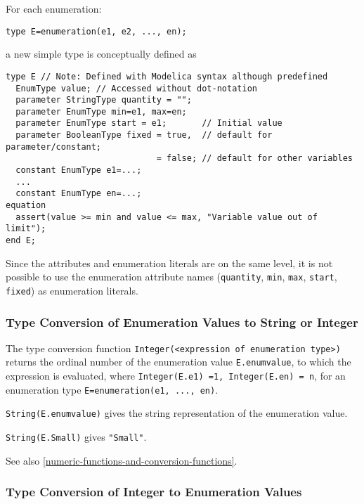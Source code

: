 For each enumeration:
\begin{lstlisting}[language=modelica]
type E=enumeration(e1, e2, ..., en);
\end{lstlisting}

a new simple type is conceptually defined as

\begin{lstlisting}[language=modelica]
type E // Note: Defined with Modelica syntax although predefined
  EnumType value; // Accessed without dot-notation
  parameter StringType quantity = "";
  parameter EnumType min=e1, max=en;
  parameter EnumType start = e1;       // Initial value
  parameter BooleanType fixed = true,  // default for parameter/constant;
                              = false; // default for other variables
  constant EnumType e1=...;
  ...
  constant EnumType en=...;
equation
  assert(value >= min and value <= max, "Variable value out of limit");
end E;
\end{lstlisting}

\begin{nonnormative}
Since the attributes and enumeration literals are on the same
level, it is not possible to use the enumeration attribute names
(\lstinline!quantity!, \lstinline!min!, \lstinline!max!, \lstinline!start!, \lstinline!fixed!) as enumeration literals.
\end{nonnormative}

\subsubsection{Type Conversion of Enumeration Values to String or Integer}\label{type-conversion-of-enumeration-values-to-string-or-integer}

The type conversion function \lstinline!Integer(<expression of enumeration type>)! returns the ordinal number of the
enumeration value \lstinline!E.enumvalue!, to which the expression is evaluated,
where \lstinline!Integer(E.e1) =1, Integer(E.en) = n!, for an enumeration type
\lstinline!E=enumeration(e1, ..., en)!.

\lstinline!String(E.enumvalue)! gives the string representation of the enumeration
value.

\begin{example}
\lstinline!String(E.Small)! gives \lstinline!"Small"!.
\end{example}

See also \cref{numeric-functions-and-conversion-functions}.

\subsubsection{Type Conversion of Integer to Enumeration Values}\label{type-conversion-of-integer-to-enumeration-values}

